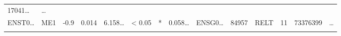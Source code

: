 \documentclass[
]{article}
\begin{document}
\begin{longtable}[]{@{}llllllllllllll@{}}
\begin{minipage}[t]{0.05\columnwidth}
17041\ldots{}\strut
\end{minipage} & \begin{minipage}[t]{0.02\columnwidth}\raggedright
\ldots{}\strut
\end{minipage}\tabularnewline
\begin{minipage}[t]{0.05\columnwidth}\raggedright
ENST0\ldots{}\strut
\end{minipage} & \begin{minipage}[t]{0.04\columnwidth}\raggedright
ME1\strut
\end{minipage} & \begin{minipage}[t]{0.04\columnwidth}\raggedright
-0.9\strut
\end{minipage} & \begin{minipage}[t]{0.04\columnwidth}\raggedright
0.014\strut
\end{minipage} & \begin{minipage}[t]{0.05\columnwidth}\raggedright
6.158\ldots{}\strut
\end{minipage} & \begin{minipage}[t]{0.05\columnwidth}\raggedright
\textless{} 0.05\strut
\end{minipage} & \begin{minipage}[t]{0.03\columnwidth}\raggedright
*\strut
\end{minipage} & \begin{minipage}[t]{0.05\columnwidth}\raggedright
0.058\ldots{}\strut
\end{minipage} & \begin{minipage}[t]{0.05\columnwidth}\raggedright
ENSG0\ldots{}\strut
\end{minipage} & \begin{minipage}[t]{0.05\columnwidth}\raggedright
84957\strut
\end{minipage} & \begin{minipage}[t]{0.05\columnwidth}\raggedright
RELT\strut
\end{minipage} & \begin{minipage}[t]{0.05\columnwidth}\raggedright
11\strut
\end{minipage} & \begin{minipage}[t]{0.05\columnwidth}\raggedright
73376399\strut
\end{minipage} & \begin{minipage}[t]{0.02\columnwidth}\raggedright
\ldots{}\strut
\end{minipage}\tabularnewline
\begin{minipage}[t]{0.05\columnwidth}\raggedright

\end{minipage}
\end{longtable}
\end{document}
